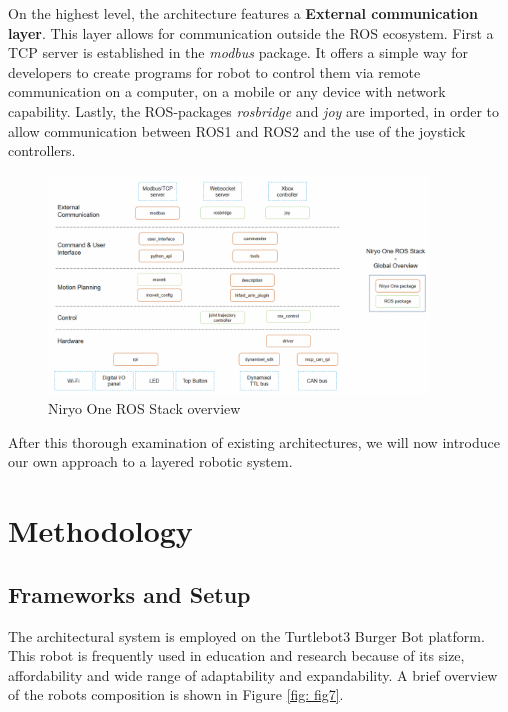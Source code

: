 \documentclass[%
paper=A4,               %
twoside=true,           %
openright,              %
11pt,                   %
bibliography=totoc,     %
titlepage=on,           %
DIV=12,                 %
BCOR=1.5cm,             %
parskip=half,            %
final
]{scrreprt}
\begin{document}
	On the highest level, the architecture features a \textbf{External communication layer}.  This layer allows for communication outside the ROS ecosystem. First a TCP server is established in the \textit{modbus} package. It offers a simple way for developers to create programs for robot to control them via remote communication on a computer, on a mobile or any device with network capability. Lastly, the ROS-packages \textit{rosbridge} and \textit{joy} are imported, in order to allow communication between ROS1 and ROS2 and the use of the joystick controllers. \autocite{roboticsGetStartedNiryo2024,roboticsNiryoOneROS2024}
	
	
	\begin{figure}[ht]
		\centering
		\includegraphics[width=0.9\textwidth]{Graphics/Niryo}
		\caption{Niryo One ROS Stack overview \autocite{roboticsNiryoOneROS2024}}
		\label{fig: fig6}
	\end{figure}
	
	After this thorough examination of existing architectures, we will now introduce our own approach to a layered robotic system. 
	
	
	\chapter{Methodology}
	\section{Frameworks and Setup}

	The architectural system is employed on the Turtlebot3 Burger Bot platform. This robot is frequently used in education and research because of its size, affordability and wide range of adaptability and expandability. A brief overview of the robots composition is shown in Figure \ref{fig: fig7}. 
		
\end{document}
